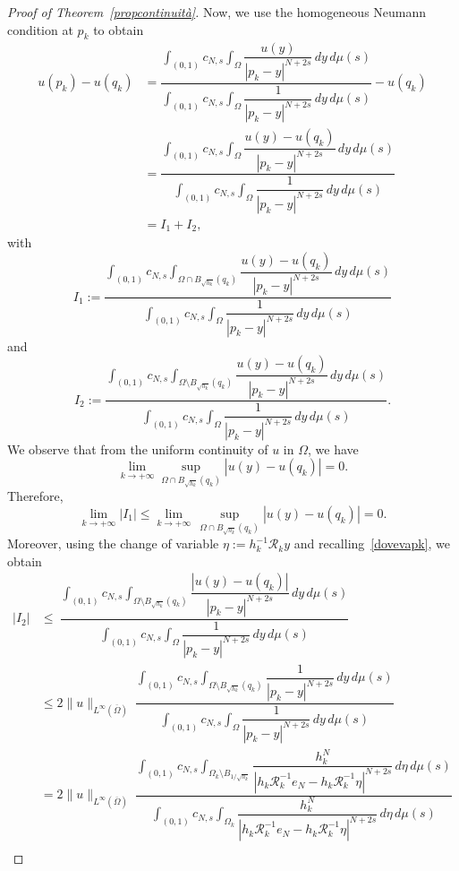 \documentclass[10pt,a4paper]{amsart}
\renewcommand{\le}{\leqslant}
\renewcommand{\leq}{\leqslant}
\begin{document}
\begin{proof}[Proof of Theorem~\ref{propcontinuità}]
Now, we use the homogeneous Neumann condition at $p_k$ to obtain
\[
\begin{split}
u(p_k)-u(q_k)&=\dfrac{\displaystyle\int_{(0,1)}c_{N,s}\int_{\Omega}\dfrac{u(y)}{|p_k-y|^{N+2s}}\,dy\,d\mu(s)}{\displaystyle\int_{(0,1)}c_{N,s}\int_{\Omega}\dfrac{1}{|p_k-y|^{N+2s}}\,dy\,d\mu(s)}-u(q_k)\\
&=\dfrac{\displaystyle\int_{(0,1)}c_{N,s}\int_{\Omega}\dfrac{u(y)-u(q_k)}{|p_k-y|^{N+2s}}\,dy\,d\mu(s)}{\displaystyle\int_{(0,1)}c_{N,s}\int_{\Omega}\dfrac{1}{|p_k-y|^{N+2s}}\,dy\,d\mu(s)}\\
&=I_1+I_2,
\end{split}
\]
with 
\[
I_1:=\dfrac{\displaystyle\int_{(0,1)}c_{N,s}\int_{\Omega\cap B_{\sqrt{h_k}}(q_k)}\dfrac{u(y)-u(q_k)}{|p_k-y|^{N+2s}}\,dy\,d\mu(s)}{\displaystyle\int_{(0,1)}c_{N,s}\int_{\Omega}\dfrac{1}{|p_k-y|^{N+2s}}\,dy\,d\mu(s)}
\]
and
\begin{equation}\label{I2}
I_2:=\dfrac{\displaystyle\int_{(0,1)}c_{N,s}\int_{\Omega\setminus B_{\sqrt{h_k}}(q_k)}\dfrac{u(y)-u(q_k)}{|p_k-y|^{N+2s}}\,dy\,d\mu(s)}{\displaystyle\int_{(0,1)}c_{N,s}\int_{\Omega}\dfrac{1}{|p_k-y|^{N+2s}}\,dy\,d\mu(s)}.
\end{equation}
We observe that from the uniform continuity of $u$ in $\Omega$, we
have
\[
\lim_{k\to +\infty}\sup_{\Omega\cap B_{\sqrt{h_k}}(q_k)}
|u(y)-u(q_k)|=0.
\]
Therefore,
\begin{equation}\label{I1to0}
\lim_{k\to +\infty} |I_1|\le\lim_{k\to +\infty} \, \sup_{\Omega\cap B_{\sqrt{h_k}}(q_k)} |u(y)-u(q_k)|= 0.
\end{equation}
Moreover, using the change of variable 
$\eta:=h_k^{-1}\mathcal{R}_k y$ and recalling~\eqref{dovevapk},
we obtain
\[
\begin{aligned}
|I_2|&\leq \ \dfrac{\displaystyle\int_{(0,1)}c_{N,s}\int_{\Omega\setminus B_{\sqrt{h_k}}(q_k)}\dfrac{|u(y)-u(q_k)|}{|p_k-y|^{N+2s}}\,dy\,d\mu(s)}{\displaystyle\int_{(0,1)}c_{N,s}\int_{\Omega}\dfrac{1}{|p_k-y|^{N+2s}}\,dy\,d\mu(s)}\\
&\leq 2\|u\|_{L^\infty(\overline{\Omega})} \ \dfrac{\displaystyle\int_{(0,1)}c_{N,s}\int_{\Omega\setminus B_{\sqrt{h_k}}(q_k)}\dfrac{1}{|p_k-y|^{N+2s}}\,dy\,d\mu(s)}{\displaystyle\int_{(0,1)}c_{N,s}\int_{\Omega}\dfrac{1}{|p_k-y|^{N+2s}}\,dy\,d\mu(s)} \\
&=2\|u\|_{L^\infty(\overline{\Omega})} \ \dfrac{\displaystyle\int_{(0,1)}c_{N,s}\int_{\Omega_k\setminus B_{1/{\sqrt{h_k}}}}\dfrac{h_k^N}{|h_k\mathcal{R}_k^{-1}e_N-h_k\mathcal{R}_k^{-1}\eta|^{N+2s}}\,d\eta\,d\mu(s)}{\displaystyle\int_{(0,1)}c_{N,s}\int_{\Omega_k}\dfrac{h_k^N}{|h_k\mathcal{R}_k^{-1}e_N-h_k\mathcal{R}_k^{-1}\eta|^{N+2s}}\,d\eta\,d\mu(s)} \\

\end{aligned}\]
\end{proof}
\end{document}
